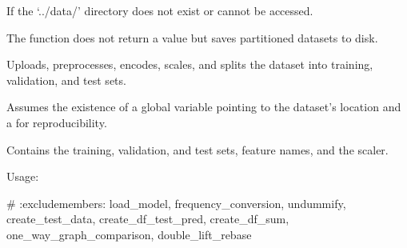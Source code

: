 \documentclass[letterpaper,10pt,english]{sphinxmanual}
\begin{document}
\begin{fulllineitems}
\begin{description}
\begin{description}
\sphinxAtStartPar
If the ‘../data/’ directory does not exist or cannot be accessed.

\end{description}

\begin{description}
\sphinxAtStartPar
The function does not return a value but saves partitioned datasets to disk.

\end{description}

\end{description}

\end{fulllineitems}


\begin{fulllineitems}
\label{\detokenize{utils:utils.upload_dataset}}
\pysigstartsignatures
{}
\pysigstopsignatures
\sphinxAtStartPar
Uploads, preprocesses, encodes, scales, and splits the dataset into training, validation, and test sets.

\sphinxAtStartPar
Assumes the existence of a global  variable pointing to the dataset’s location and a  for reproducibility.
\begin{description}
\begin{description}
\sphinxAtStartPar
Contains the training, validation, and test sets, feature names, and the scaler.

\end{description}

\end{description}

\sphinxAtStartPar
Usage:

\end{fulllineitems}


\sphinxAtStartPar
\#   :exclude\sphinxhyphen{}members: load\_model,  frequency\_conversion, undummify, create\_test\_data, create\_df\_test\_pred, create\_df\_sum, one\_way\_graph\_comparison, double\_lift\_rebase
\end{document}
